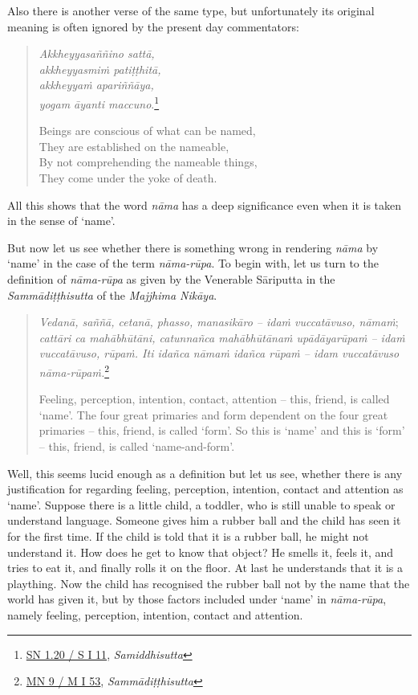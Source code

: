 Also there is another verse of the same type, but unfortunately its original meaning is often ignored by the present day commentators:

\begin{quote}
\emph{Akkheyyasaññino sattā,}\\
\emph{akkheyyasmiṁ patiṭṭhitā,}\\
\emph{akkheyyaṁ apariññāya,}\\
\emph{yogam āyanti maccuno}.\footnote{\href{https://suttacentral.net/sn1.20/pli/ms}{SN 1.20 / S I 11}, \emph{Samiddhisutta}}

Beings are conscious of what can be named,\\
They are established on the nameable,\\
By not comprehending the nameable things,\\
They come under the yoke of death.
\end{quote}

All this shows that the word \emph{nāma} has a deep significance even when it is taken in the sense of `name'.

But now let us see whether there is something wrong in rendering \emph{nāma} by `name' in the case of the term \emph{nāma-rūpa}. To begin with, let us turn to the definition of \emph{nāma-rūpa} as given by the Venerable Sāriputta in the \emph{Sammādiṭṭhisutta} of the \emph{Majjhima Nikāya}.

\clearpage

\begin{quote}
\emph{Vedanā, saññā, cetanā, phasso, manasikāro -- idaṁ vuccatāvuso, nāmaṁ}; \emph{cattāri ca mahābhūtāni, catunnañca mahābhūtānaṁ upādāyarūpaṁ -- idaṁ vuccatāvuso, rūpaṁ. Iti idañca nāmaṁ idañca rūpaṁ -- idam vuccatāvuso nāma-rūpaṁ.}\footnote{\href{https://suttacentral.net/mn9/pli/ms}{MN 9 / M I 53}, \emph{Sammādiṭṭhisutta}}

Feeling, perception, intention, contact, attention -- this, friend, is called `name'. The four great primaries and form dependent on the four great primaries -- this, friend, is called `form'. So this is `name' and this is `form' -- this, friend, is called `name-and-form'.
\end{quote}

Well, this seems lucid enough as a definition but let us see, whether there is any justification for regarding feeling, perception, intention, contact and attention as `name'. Suppose there is a little child, a toddler, who is still unable to speak or understand language. Someone gives him a rubber ball and the child has seen it for the first time. If the child is told that it is a rubber ball, he might not understand it. How does he get to know that object? He smells it, feels it, and tries to eat it, and finally rolls it on the floor. At last he understands that it is a plaything. Now the child has recognised the rubber ball not by the name that the world has given it, but by those factors included under `name' in \emph{nāma-rūpa}, namely feeling, perception, intention, contact and attention.

